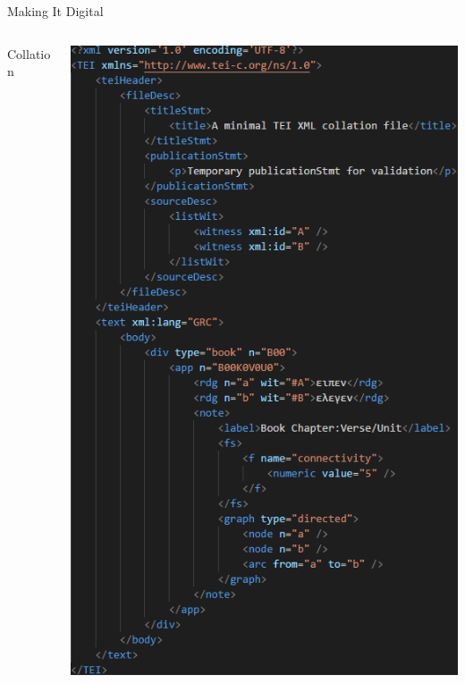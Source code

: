 \documentclass[10pt]{beamer}
\begin{document}
	\begin{frame}{Making It Digital}\label{slide:making-it-digital}
		\begin{columns}
			\begin{column}{0.55\textwidth}
				\begin{center}
					Collation
				\end{center}
			\end{column}
			\begin{column}{0.4\textwidth}
				\includegraphics[width=\textwidth]{../graphics/collation-xml.png}
			\end{column}
		\end{columns}
	\end{frame}
\end{document}
